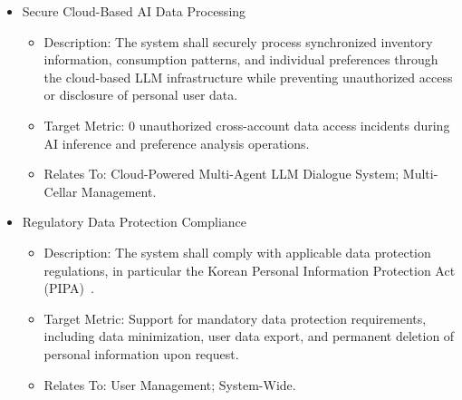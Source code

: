 \documentclass[conference]{IEEEtran}
\begin{document}
\begin{itemize}
    \item Secure Cloud-Based AI Data Processing
    \begin{itemize}
        \item Description: The system shall securely process synchronized inventory information, consumption patterns, and individual preferences through the cloud-based LLM infrastructure while preventing unauthorized access or disclosure of personal user data.
        \item Target Metric: 0 unauthorized cross-account data access incidents during AI inference and preference analysis operations.
        \item Relates To: Cloud-Powered Multi-Agent LLM Dialogue System; Multi-Cellar Management.
    \end{itemize}

    \item Regulatory Data Protection Compliance
    \begin{itemize}
        \item Description: The system shall comply with applicable data protection regulations, in particular the Korean Personal Information Protection Act (PIPA)~\cite{pipa}.
        \item Target Metric: Support for mandatory data protection requirements, including data minimization, user data export, and permanent deletion of personal information upon request.
        \item Relates To: User Management; System-Wide.
    \end{itemize}
\end{itemize}
\end{document}
